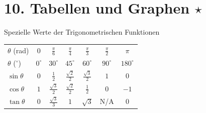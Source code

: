 \section{10. Tabellen und Graphen \texorpdfstring{$\star$}{*}}

\begin{minipage}{\linewidth}
\Tab Spezielle Werte der Trigonometrischen Funktionen

\begin{tabular}{l | c c c c c c}
    $\theta$ (rad) & $0$ & $\frac{\pi}{6}$ & $\frac{\pi}{4}$ & $\frac{\pi}{3}$ & $\frac{\pi}{2}$ & $\pi$ \\[1ex]
    $\theta$ ($^\circ$) & $0^\circ$ & $30^\circ$ & $45^\circ$ & $60^\circ$ & $90^\circ$ & $180^\circ$ \\[0.5ex]
    \hline
    $\sin\theta$ & $0$ & $\frac{1}{2}$ & $\frac{\sqrt{2}}{2}$ & $\frac{\sqrt{3}}{2}$ & $1$ & $0$ \\[1ex]
    $\cos\theta$ & $1$ & $\frac{\sqrt{3}}{2}$ & $\frac{\sqrt{2}}{2}$ & $\frac{1}{2}$ & $0$ & $-1$ \\[1ex]
    $\tan\theta$ & $0$ & $\frac{\sqrt{3}}{3}$ & $1$ & $\sqrt{3}$ & N/A & $0$
\end{tabular}
\end{minipage}

